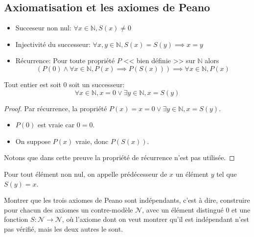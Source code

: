 \subsection{Axiomatisation et les axiomes de Peano}

\begin{definition}
	\begin{itemize}
		\item Succeseur non nul: $\forall x \in \mathbb{N}, S(x) \neq 0$
		\item Injectivité du successeur: $\forall x,y \in \mathbb{N}, S(x) = S(y) \implies x = y$
		\item Récurrence: Pour toute propriété $P$ << bien définie >> sur $\mathbb{N}$ alors
		      $$ \left( P(0) \wedge \forall x \in \mathbb{N}, P(x) \implies P(S(x))\right) \implies \forall x \in \mathbb{N}, P(x) $$
	\end{itemize}
\end{definition}

\begin{lemma}
	Tout entier est soit $0$ soit un successeur:
	$$ \forall x \in \mathbb{N}, x = 0 \vee \exists y \in \mathbb{N}, x = S(y) $$
\end{lemma}

\begin{proof}
	Par récurrence, la propriété $P(x) = x = 0 \vee \exists y \in \mathbb{N}, x = S(y)$.
	\begin{itemize}
		\item $P(0)$ est vraie car $0 = 0$.
		\item On suppose $P(x)$ vraie, donc $P(S(x))$.
	\end{itemize}
	Notons que dans cette preuve la propriété de récurrence n'est pas utilisée.
\end{proof}


\begin{definition}[Prédécesseur]
	Pour tout élément non nul, on appelle prédécesseur de $x$ un élément $y$ tel que $S(y) = x$.
\end{definition}

\begin{exercice}
	Montrer que les trois axiomes de Peano sont indépendants, c'est à dire, construire pour chacun des axiomes un
	contre-modèle $\mathscr{N}$, avec un élément distingué $0$ et une fonction $S : \mathscr{N} \to \mathscr{N}$, où l’axiome dont on
	veut montrer qu’il est indépendant n’est pas vérifié, mais les deux autres le sont.
\end{exercice}
